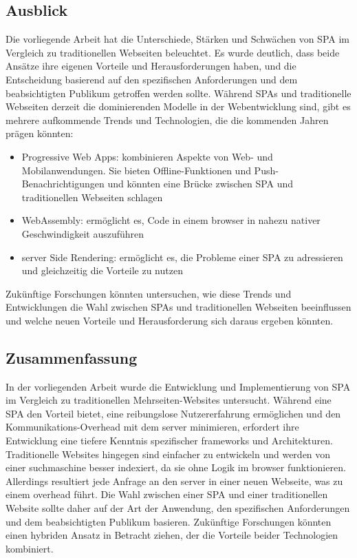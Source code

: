\subsection{Ausblick}
Die vorliegende Arbeit hat die Unterschiede, Stärken und Schwächen von \ac{SPA} im Vergleich zu traditionellen Webseiten beleuchtet.
Es wurde deutlich, dass beide Ansätze ihre eigenen Vorteile und Herausforderungen haben, und die Entscheidung basierend auf den spezifischen Anforderungen und dem beabsichtigten Publikum getroffen werden sollte.
Während SPAs und traditionelle Webseiten derzeit die dominierenden Modelle in der Webentwicklung sind, gibt es mehrere aufkommende Trends und Technologien, die die kommenden Jahren prägen könnten:

\begin{itemize}
    \item Progressive Web Apps: kombinieren Aspekte von Web- und Mobilanwendungen. Sie bieten Offline-Funktionen und Push-Benachrichtigungen und könnten eine Brücke zwischen \ac{SPA} und traditionellen Webseiten schlagen
    \item WebAssembly: ermöglicht es, Code in einem \gls{browser} in nahezu nativer Geschwindigkeit auszuführen
    \item \gls{server} Side Rendering: ermöglicht es, die Probleme einer \ac{SPA} zu adressieren und gleichzeitig die Vorteile zu nutzen
\end{itemize}

Zukünftige Forschungen könnten untersuchen, wie diese Trends und Entwicklungen die Wahl zwischen SPAs und traditionellen Webseiten beeinflussen und welche neuen Vorteile und Herausforderung sich daraus ergeben könnten.

\subsection{Zusammenfassung}
In der vorliegenden Arbeit wurde die Entwicklung und Implementierung von \ac{SPA} im Vergleich zu traditionellen Mehrseiten-Websites untersucht.
Während eine \ac{SPA} den Vorteil bietet, eine reibungslose Nutzererfahrung ermöglichen und den Kommunikations-Overhead mit dem \gls{server} minimieren, erfordert ihre Entwicklung eine tiefere Kenntnis spezifischer \gls{framework}s und Architekturen.
Traditionelle Websites hingegen sind einfacher zu entwickeln und werden von einer \gls{suchmaschine} besser indexiert, da sie ohne Logik im \gls{browser} funktionieren.
Allerdings resultiert jede Anfrage an den \gls{server} in einer neuen Webseite, was zu einem \gls{overhead} führt.
Die Wahl zwischen einer \ac{SPA} und einer traditionellen Website sollte daher auf der Art der Anwendung, den spezifischen Anforderungen und dem beabsichtigten Publikum basieren.
Zukünftige Forschungen könnten einen hybriden Ansatz in Betracht ziehen, der die Vorteile beider Technologien kombiniert.